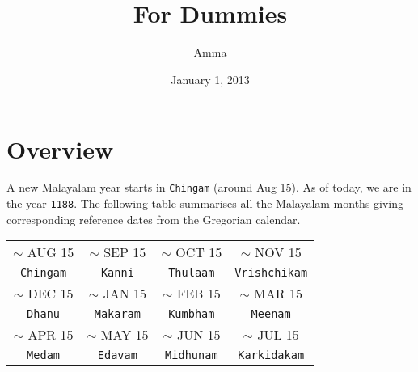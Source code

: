 \documentclass[10pt,twoside]{article}
\title{\textbf{\doctitle}\\
For Dummies}
\author{Amma}
\date{January 1, 2013}
\begin{document}
\thispagestyle{empty}

\maketitle

\section{Overview}
A new Malayalam year starts in \verb|Chingam| (around Aug 15). As of today, we are in the year \verb|1188|. The following table summarises all the Malayalam months giving corresponding reference dates from the Gregorian calendar.

\begin{table}[!h]
\centering
\begin{tabular}{| c | c | c | c |}
\hline
$\sim$ AUG 15 & $\sim$ SEP 15 & $\sim$ OCT 15 & $\sim$ NOV 15 \\ 
\verb|Chingam| & \verb|Kanni| & \verb|Thulaam| & \verb|Vrishchikam| \\ \hline
$\sim$ DEC 15 & $\sim$ JAN 15 & $\sim$ FEB 15 & $\sim$ MAR 15 \\ 
\verb|Dhanu| & \verb|Makaram| & \verb|Kumbham| & \verb|Meenam| \\ \hline
$\sim$ APR 15 & $\sim$ MAY 15 & $\sim$ JUN 15 & $\sim$ JUL 15 \\ 
\verb|Medam| & \verb|Edavam| & \verb|Midhunam| & \verb|Karkidakam| \\ \hline
\end{tabular}
\label{table:overview}
\end{table}
\end{document}

